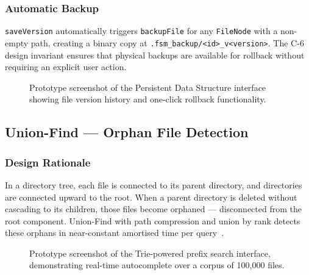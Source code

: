 \documentclass[conference]{IEEEtran}
\begin{document}
\subsubsection{Automatic Backup}
\texttt{saveVersion} automatically triggers \texttt{backupFile} for any \texttt{FileNode} with a non-empty path, creating a binary copy at \texttt{.fsm\_backup/<id>\_v<version>}. The C-6 design invariant ensures that physical backups are available for rollback without requiring an explicit user action.

\begin{figure}[htbp]
\centering
{}
\caption{Prototype screenshot of the Persistent Data Structure interface showing file version history and one-click rollback functionality.}
\label{fig:ui_history}
\end{figure}

\subsection{Union-Find — Orphan File Detection}

\subsubsection{Design Rationale}
In a directory tree, each file is connected to its parent directory, and directories are connected upward to the root. When a parent directory is deleted without cascading to its children, those files become orphaned — disconnected from the root component. Union-Find with path compression and union by rank detects these orphans in near-constant amortised time per query~\cite{tarjan1984worst}.

\begin{figure}[htbp]
\centering
{}
\caption{Prototype screenshot of the Trie-powered prefix search interface, demonstrating real-time autocomplete over a corpus of 100{,}000 files.}
\label{fig:ui_search}
\end{figure}
\end{document}
